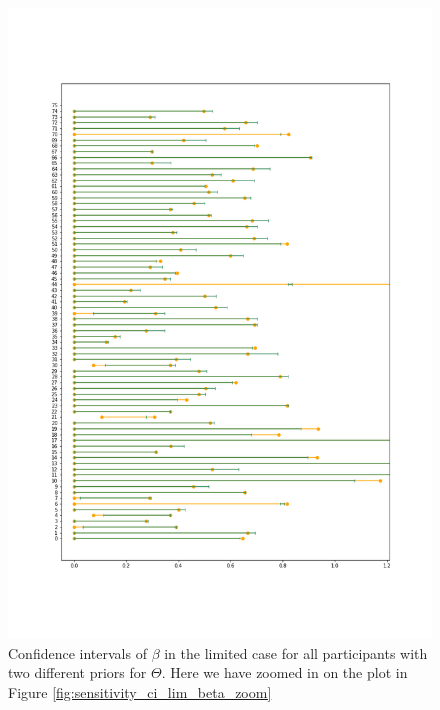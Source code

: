 \begin{figure}
    \centering
    \includegraphics[scale=0.37]{pictures/Sensitivity/ci_lim_beta_zoom2.png}
    \caption[CIs for $\beta$ in the limited case]{Confidence intervals of $\beta$ in the limited case for all participants with two different priors for $\Theta$. Here we have zoomed in on the plot in Figure \ref{fig:sensitivity_ci_lim_beta_zoom}}
    \label{fig:sensitivity_ci_lim_beta_zoom2}
\end{figure}